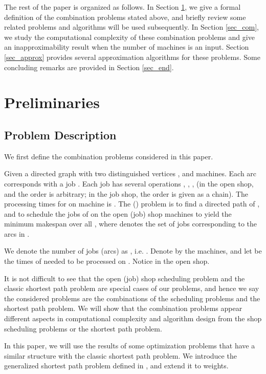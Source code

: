 \documentclass{llncs}
\numberwithin{subcase}{case}
\begin{document}
The rest of the paper is organized as follows. In Section \ref{sec_pre}, we give a formal definition of the combination problems stated above, and briefly review some related problems and algorithms will be used subsequently. In Section \ref{sec_com}, we study the computational complexity of these combination problems and give an inapproximability result when the number of machines is an input. Section \ref{sec_approx} provides several approximation algorithms for these problems. Some concluding remarks are provided in Section \ref{sec_end}.

\section{Preliminaries}\label{sec_pre}
\subsection{Problem Description}\label{sec_pd}
We first define the combination problems considered in this paper.

\begin{definition}
Given a directed graph  with two distinguished vertices , and  machines. Each arc  corresponds with a job . Each job  has several operations , , ,  (in the open shop,  and the order is arbitrary; in the job shop, the order is given as a chain). The processing times for  on machine  is . The  () problem is to find a  directed path  of , and to schedule the jobs of  on the open (job) shop machines to yield the minimum makespan over all , where  denotes the set of jobs corresponding to the arcs in .\label{d_comb}
\end{definition}

We denote the number of jobs (arcs) as , i.e. . Denote by  the  machines, and let  be the times of  needed to be processed on . Notice  in the open shop.

It is not difficult to see that the open (job) shop scheduling problem and the classic shortest path problem are special cases of our problems, and hence we say the considered problems are the combinations of the scheduling problems and the shortest path problem. We will show that the combination problems appear different aspects in computational complexity and algorithm design from the shop scheduling problems or the shortest path problem.

In this paper, we will use the results of some optimization problems that
have a similar structure with the classic shortest path problem. We introduce the generalized shortest path problem defined in \cite{NW13}, and extend it to  weights.
\end{document}
